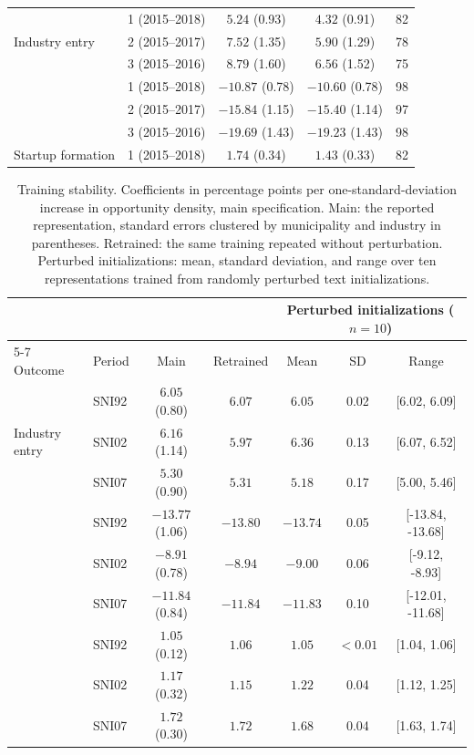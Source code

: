 \documentclass[9pt,twoside]{pnas-new}
\begin{document}
\begin{table}[H]
\begin{tabular}{llccr}
\multirow{3}{*}{Industry entry} & 1 (2015--2018) & $5.24$ (0.93) & $4.32$ (0.91) & 82 \\
 & 2 (2015--2017) & $7.52$ (1.35) & $5.90$ (1.29) & 78 \\
 & 3 (2015--2016) & $8.79$ (1.60) & $6.56$ (1.52) & 75 \\
\addlinespace
\multirow{3}{*}{Industry exit} & 1 (2015--2018) & $-10.87$ (0.78) & $-10.60$ (0.78) & 98 \\
 & 2 (2015--2017) & $-15.84$ (1.15) & $-15.40$ (1.14) & 97 \\
 & 3 (2015--2016) & $-19.69$ (1.43) & $-19.23$ (1.43) & 98 \\
\addlinespace
Startup formation & 1 (2015--2018) & $1.74$ (0.34) & $1.43$ (0.33) & 82 \\
\bottomrule
\end{tabular}
\end{table}

\begin{table}[H]
\centering
\small
\setlength{\tabcolsep}{4pt}
\caption{Training stability. Coefficients in percentage points per one-standard-deviation increase in opportunity density, main specification. Main: the reported representation, standard errors clustered by municipality and industry in parentheses. Retrained: the same training repeated without perturbation. Perturbed initializations: mean, standard deviation, and range over ten representations trained from randomly perturbed text initializations.}
\label{tab:holdout-seeds}
\begin{tabular}{llccccc}
\toprule
 & & & & \multicolumn{3}{c}{Perturbed initializations ($n=10$)} \\
\cmidrule(lr){5-7}
Outcome & Period & Main & Retrained & Mean & SD & Range \\
\midrule
\multirow{3}{*}{Industry entry} & SNI92 & $6.05$ (0.80) & $6.07$ & $6.05$ & 0.02 & [6.02, 6.09] \\
 & SNI02 & $6.16$ (1.14) & $5.97$ & $6.36$ & 0.13 & [6.07, 6.52] \\
 & SNI07 & $5.30$ (0.90) & $5.31$ & $5.18$ & 0.17 & [5.00, 5.46] \\
\addlinespace
\multirow{3}{*}{Industry exit} & SNI92 & $-13.77$ (1.06) & $-13.80$ & $-13.74$ & 0.05 & [-13.84, -13.68] \\
 & SNI02 & $-8.91$ (0.78) & $-8.94$ & $-9.00$ & 0.06 & [-9.12, -8.93] \\
 & SNI07 & $-11.84$ (0.84) & $-11.84$ & $-11.83$ & 0.10 & [-12.01, -11.68] \\
\addlinespace
\multirow{3}{*}{Startup formation} & SNI92 & $1.05$ (0.12) & $1.06$ & $1.05$ & $<0.01$ & [1.04, 1.06] \\
 & SNI02 & $1.17$ (0.32) & $1.15$ & $1.22$ & 0.04 & [1.12, 1.25] \\
 & SNI07 & $1.72$ (0.30) & $1.72$ & $1.68$ & 0.04 & [1.63, 1.74] \\
\bottomrule
\end{tabular}
\end{table}
\end{document}
